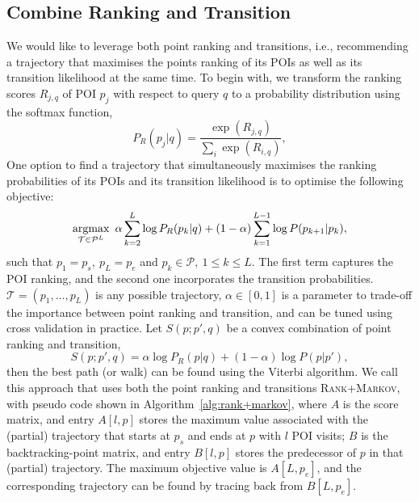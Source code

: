 \subsection{Combine Ranking and Transition}
\label{sec:rank+markov}

We would like to leverage both point ranking and transitions,
i.e., recommending a trajectory that maximises the points ranking of its POIs as well as its transition likelihood at the same time.
To begin with, we transform the ranking scores $R_{j,q}$ of POI $p_j$ with respect to query $q$
to a probability distribution using the softmax function,
\begin{equation}
\label{eq:rankprob}
P_R(p_j | q) = \frac{\exp(R_{j,q})}{\sum_i \exp(R_{i,q})},
\end{equation}
One option to find a trajectory that simultaneously maximises the ranking probabilities of its POIs and its transition likelihood is to optimise the following objective:
\vspace{-0.3em}
\begin{equation*}
    \operatorname*{argmax}_{\mathcal{T} \in \mathcal{P}^L} ~\alpha \sum_{k=2}^{L} \log P_R(p_{k} | q) +
                                     (1-\alpha) \sum_{k=1}^{L-1} \log P(p_{k+1} | p_{k}),
\end{equation*}
such that
$p_{1} = p_s, ~ p_{L} = p_e$ and
$p_{k} \in \mathcal{P}, ~1 \le k \le L$.
The first term captures the POI ranking, and the second one incorporates the transition probabilities.
$\mathcal{T} = (p_{1}, \dots, p_{L})$ is any possible trajectory,
$\alpha \in [0, 1]$ is a parameter to trade-off the importance between point ranking and transition,
and can be tuned using cross validation in practice.
Let $S(p; p', q)$ be a convex combination of point ranking and transition,
\vspace{-0.3em}
\begin{equation}\label{eq:combined-score}
    S(p; p', q)  = \alpha \log P_R(p|q) + (1-\alpha) \log P(p|p'),
\end{equation}
then the best path (or walk) can be found using the Viterbi algorithm.
We call this approach that uses both the point ranking and transitions \textsc{Rank+Markov},
with pseudo code shown in Algorithm~\ref{alg:rank+markov},
where $A$ is the score matrix, and entry $A[l, p]$ stores the maximum value associated with the (partial) trajectory
that starts at $p_s$ and ends at $p$ with $l$ POI visits;
$B$ is the backtracking-point matrix, and entry $B[l, p]$ stores the predecessor of $p$ in that (partial) trajectory.
The maximum objective value is $A[L, p_e]$,
and the corresponding trajectory can be found by tracing back from $B[L, p_e]$.

